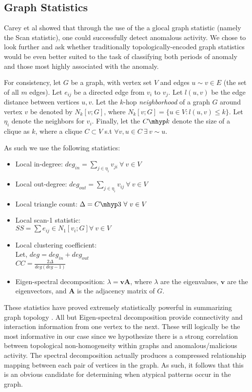 \documentclass[11pt,letterpaper]{article}
\begin{document}
\subsection{Graph Statistics} \label{graph_stats}
Carey et al \cite{priebe2005scan} showed that through the use of the a glocal graph 
statistic (namely the Scan statistic), one could successfully detect anomalous activity.
We chose to look further and ask whether traditionally topologically-encoded graph statistics would
be even better suited to the task of classifying both periods of anomaly and those
most highly associated with the anomaly.

For consistency, let $G$ be a graph, with vertex set $V$ and edges $u \sim v \in E$ (the set of
all $m$ edges). Let $e_{ij}$ be a directed edge from $v_i$ to $v_j$. Let $l(u,v)$ be the edge
distance between vertices $u, v$. Let the $k$-hop \emph{neighborhood} of a graph $G$ around
vertex $v$ be denoted by $N_k[v;G]$, where $N_k[v;G] = \{u \in V:l(u,v) \le k\}$. Let $\eta_i$ 
denote the neighbors for $v_i$. Finally, let the $C\mhyp k$ denote the size of a clique as $k$, where a clique $C \subset V$ s.t $\forall v,u \in C\ \exists\ v \sim u$.

 
As such we use the following statistics:
\begin{itemize}
\item Local in-degree: $deg_{in} = \sum_{j \in \eta_i} v_{ji}\  \forall\ v \in V$
\item Local out-degree: $deg_{out} = \sum_{j \in \eta_i} v_{ij}\  \forall\ v \in V$ 
\item Local triangle count: $\Delta = C\mhyp3 \  \forall\ v \in V$
\item Local scan-1 statistic: \\ $SS = \sum e_{ij} \in N_1[v_i;G] \forall\ v \in V$
\item Local clustering coefficient: \\ Let, $deg = deg_{in} + deg_{out}$ 
\\ $CC = \frac{2\Delta}{deg (deg-1)}$
\item Eigen-spectral decomposition: $\lambda = \mathbf{vA}$, where $\lambda$ are the
eigenvalues, $\mathbf{v}$ are the eigenvectors, and $\mathbf{A}$ is the adjacency matrix of $G$.

\end{itemize}
These statistics have proved extremely statistically powerful in summarizing graph
topology \cite{pao2011statistical}. All but Eigen-spectral decomposition provide
connectivity and interaction information from one vertex to the next. These will
logically be the most informative in our case since we hypothesize there is a strong
correlation between topological non-homogeneity within graphs and anomalous/malicious
activity. The spectral decomposition actually produces a compressed relationship mapping
between each pair of vertices in the graph. As such, it follows that this is an obvious
candidate for determining when atypical patterns occur in the graph.
\end{document}
